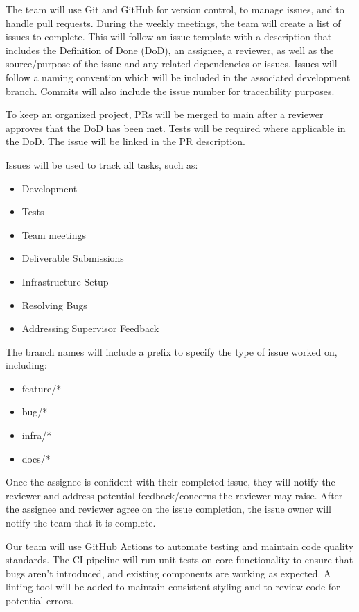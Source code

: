 \documentclass{article}
\begin{document}
The team will use Git and GitHub for version control, to manage issues, and to handle pull requests. During the weekly meetings, the team will create a list of issues to complete. This will follow an issue template with a description that includes the Definition of Done (DoD), an assignee, a reviewer, as well as the source/purpose of the issue and any related dependencies or issues. Issues will follow a naming convention which will be included in the associated development branch. Commits will also include the issue number for traceability purposes.

\noindent To keep an organized project, PRs will be merged to main after a reviewer approves that the DoD has been met. Tests will be required where applicable in the DoD. The issue will be linked in the PR description.

Issues will be used to track all tasks, such as:
\begin{itemize}
    \item Development
    \item Tests
    \item Team meetings
    \item Deliverable Submissions
    \item Infrastructure Setup
    \item Resolving Bugs
    \item Addressing Supervisor Feedback
\end{itemize}

The branch names will include a prefix to specify the type of issue worked on, including:
\begin{itemize}
    \item feature/*
    \item bug/*
    \item infra/*
    \item docs/*
\end{itemize}

Once the assignee is confident with their completed issue, they will notify the reviewer and address potential feedback/concerns the reviewer may raise. After the assignee and reviewer agree on the issue completion, the issue owner will notify the team that it is complete.


Our team will use GitHub Actions to automate testing and maintain code quality standards. The CI pipeline will run unit tests on core functionality to ensure that bugs aren’t introduced, and existing components are working as expected. A linting tool will be added to maintain consistent styling and to review code for potential errors.
\end{document}
